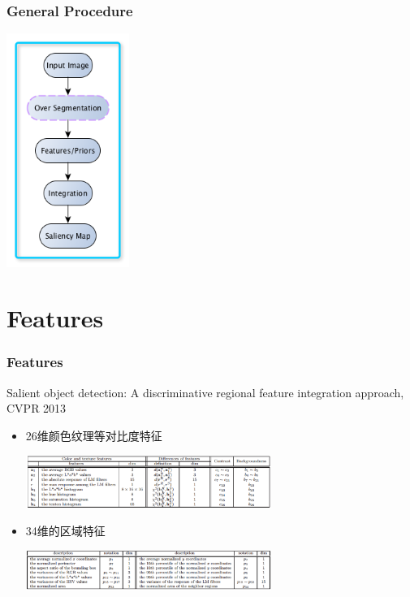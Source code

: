 \documentclass[notheorems,serif,table,compress]{beamer}  %
\begin{document}
\begin{frame}
\frametitle{General Procedure}
\centering\includegraphics[width=4cm]{flowchart.png}
\end{frame}


\section{Features}

\begin{frame}
\frametitle{Features}
Salient object detection: A discriminative regional feature integration approach, CVPR 2013
\begin{itemize}
\item 26维颜色纹理等对比度特征

\includegraphics[width=8cm]{ContrastFeature.png}
\item 34维的区域特征

\includegraphics[width=8cm]{RegionProperty.png}
\end{itemize}
\end{frame}
\end{document}

